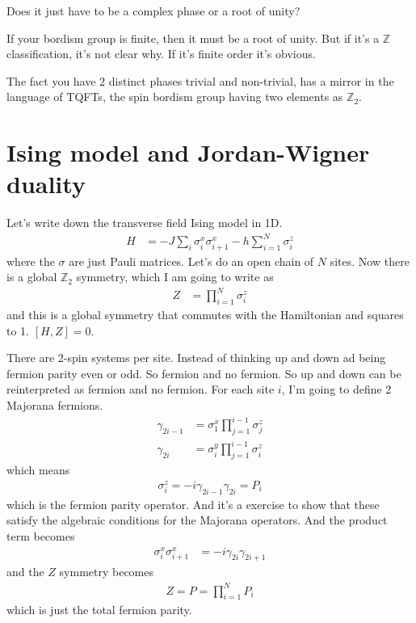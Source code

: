 \begin{question}
    Does it just have to be a complex phase or a root of unity?
\end{question}
If your bordism group is finite,
then it must be a root of unity.
But if it's a $\mathbb{Z}$ classification,
it's not clear why.
If it's finite order it's obvious.

The fact you have 2 distinct phases trivial and non-trivial,
has a mirror in the language of TQFTs,
the spin bordism group having two elements as $\mathbb{Z}_2$.

\section{Ising model and Jordan-Wigner duality}
Let's write down the transverse field Ising model in 1D.
\begin{align}
    H &=
    -J\sum_{i} \sigma_i^x \sigma_{i+1}^x
    - h\sum_{i=1}^{N}\sigma_i^{z}
\end{align}
where the $\sigma$ are just Pauli matrices.
Let's do an open chain of $N$ sites.
Now there is a global $\mathbb{Z}_2$ symmetry,
which I am going to write as
\begin{align}
    Z &=
    \prod_{i=1}^{N}\sigma_i^z
\end{align}
and this is a global symmetry that commutes with the Hamiltonian and squares to
1.
$[H,Z]=0$.

There are 2-spin systems per site.
Instead of thinking up and down ad being fermion parity even or odd.
So fermion and no fermion.
So up and down can be reinterpreted as fermion and no fermion.
For each site $i$,
I'm going to define 2 Majorana fermions.
\begin{align}
    \gamma_{2i - 1} &=
    \sigma_1^x \prod_{j=1}^{i-1}\sigma_j^{z}\\
    \gamma_{2i} &=
    \sigma_i^y \prod_{j=1}^{i-1}\sigma_i^{z}
\end{align}
which means
\begin{align}
    \sigma_i^z = -i \gamma_{2i - 1}\gamma_{2i} = P_i
\end{align}
which is the fermion parity operator.
And it's a exercise to show that these satisfy the algebraic conditions for the
Majorana operators.
And the product term becomes
\begin{align}
    \sigma_i^x \sigma_{i+1}^x &=
    -i \gamma_{2i}\gamma_{2i + 1}
\end{align}
and the $Z$ symmetry becomes
\begin{align}
    Z = P = \prod_{i=1}^{N}P_i
\end{align}
which is just the total fermion parity.

